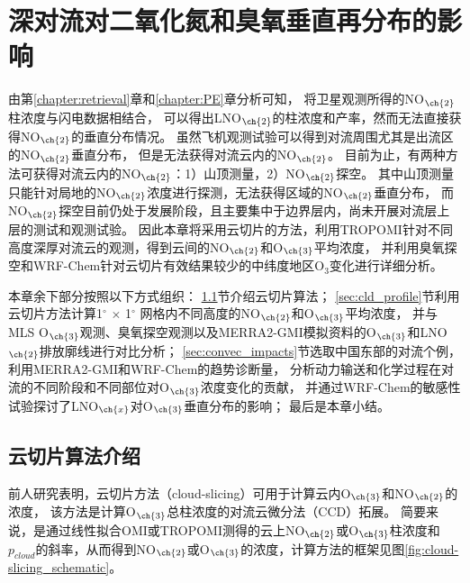 
\chapter{深对流对二氧化氮和臭氧垂直再分布的影响}

由第\ref{chapter:retrieval}章和\ref{chapter:PE}章分析可知，
将卫星观测所得的NO$_{\ch{2}}$柱浓度与闪电数据相结合，
可以得出LNO$_{\ch{2}}$的柱浓度和产率，然而无法直接获得NO$_{\ch{2}}$的垂直分布情况。
虽然飞机观测试验可以得到对流周围尤其是出流区的NO$_{\ch{2}}$垂直分布\citep{Barth.2019}，
但是无法获得对流云内的NO$_{\ch{2}}$。
目前为止，有两种方法可获得对流云内的NO$_{\ch{2}}$：1）山顶测量，2）NO$_{\ch{2}}$探空。
其中山顶测量只能针对局地的NO$_{\ch{2}}$浓度进行探测，无法获得区域的NO$_{\ch{2}}$垂直分布\citep{Reiter.1970,Wang.2021a}，
而NO$_{\ch{2}}$探空目前仍处于发展阶段，且主要集中于边界层内\citep{Sluis.2010}，尚未开展对流层上层的测试和观测试验。
因此本章将采用云切片的方法，利用TROPOMI针对不同高度深厚对流云的观测，得到云间的NO$_{\ch{2}}$和O$_{\ch{3}}$平均浓度，
并利用臭氧探空和WRF-Chem针对云切片有效结果较少的中纬度地区O$_3$变化进行详细分析。

本章余下部分按照以下方式组织：
\ref{sec:cloud-slicing}节介绍云切片算法；
\ref{sec:cld_profile}节利用云切片方法计算1$^{\circ}$ $\times$ 1$^{\circ}$ 网格内不同高度的NO$_{\ch{2}}$和O$_{\ch{3}}$平均浓度，
并与MLS O$_{\ch{3}}$观测、臭氧探空观测以及MERRA2-GMI模拟资料的O$_{\ch{3}}$和LNO$_{\ch{2}}$排放廓线进行对比分析；
\ref{sec:convec_impacts}节选取中国东部的对流个例，利用MERRA2-GMI和WRF-Chem的趋势诊断量，
分析动力输送和化学过程在对流的不同阶段和不同部位对O$_{\ch{3}}$浓度变化的贡献，
并通过WRF-Chem的敏感性试验探讨了LNO$_{\ch{x}}$对O$_{\ch{3}}$垂直分布的影响；
最后是本章小结。


\section{云切片算法介绍} \label{sec:cloud-slicing}

前人研究表明，云切片方法（cloud-slicing）可用于计算云内O$_{\ch{3}}$和NO$_{\ch{2}}$的浓度，
该方法是计算O$_{\ch{3}}$总柱浓度的对流云微分法（CCD）拓展\citep{Ziemke.1998,Ziemke.2001}。
简要来说，是通过线性拟合OMI或TROPOMI测得的云上NO$_{\ch{2}}$或O$_{\ch{3}}$柱浓度和$p_{cloud}$的斜率，从而得到NO$_{\ch{2}}$或O$_{\ch{3}}$的浓度，计算方法的框架见图\ref{fig:cloud-slicing_schematic}。

